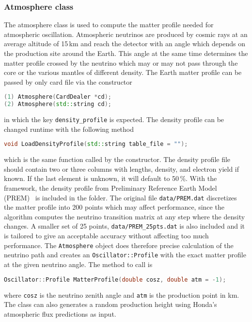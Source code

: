 \documentclass[a4paper, 11pt]{article}
\begin{document}
\subsubsection{Atmosphere class}
\label{sec:atmosphere}

The atmosphere class is used to compute the matter profile needed for atmospheric oscillation.
Atmospheric neutrinos are produced by cosmic rays at an average altitude of 15\,km and reach the detector with an angle which depends %
on the production site around the Earth.
This angle at the same time determines the matter profile crossed by the neutrino which may or may not pass through the core or the various mantles %
of different density.
The Earth matter profile can be passed by only card file via the constructor
\begin{lstlisting}[language=C++]
(1) Atmosphere(CardDealer *cd);
(2) Atmosphere(std::string cd);
\end{lstlisting}
in which the key \texttt{density\_profile} is expected.
The density profile can be changed runtime with the following method 
\begin{lstlisting}[language=C++]
    void LoadDensityProfile(std::string table_file = "");
\end{lstlisting}
which is the same function called by the constructor.
The density profile file should contain two or three columns with lengths, density, and electron yield if known.
If the last element is unknown, it will default to 50\,\%.
With the framework, the density profile from Preliminary Reference Earth Model (PREM)~\cite{Dziewonski:1981xy} is included in the  folder.
The original file \texttt{data/PREM.dat} discretizes the matter profile into 200 points which may affect performance, %
since the algorithm computes the neutrino transition matrix at any step where the density changes.
A smaller set of 25 points, \texttt{data/PREM\_25pts.dat} is also included and it is tailored to give an acceptable accuracy without affecting too much performance.
The \texttt{Atmosphere} object does therefore precise calculation of the neutrino path and creates an \texttt{Oscillator::Profile} %
with the exact matter profile at the given neutrino angle.
The method to call is
\begin{lstlisting}[language=C++]
    Oscillator::Profile MatterProfile(double cosz, double atm = -1);
\end{lstlisting}
where \texttt{cosz} is the neutrino zenith angle and \texttt{atm} is the production point in km.
The class can also generates a random production height using Honda's atmospheric flux predictions as input.
\end{document}
